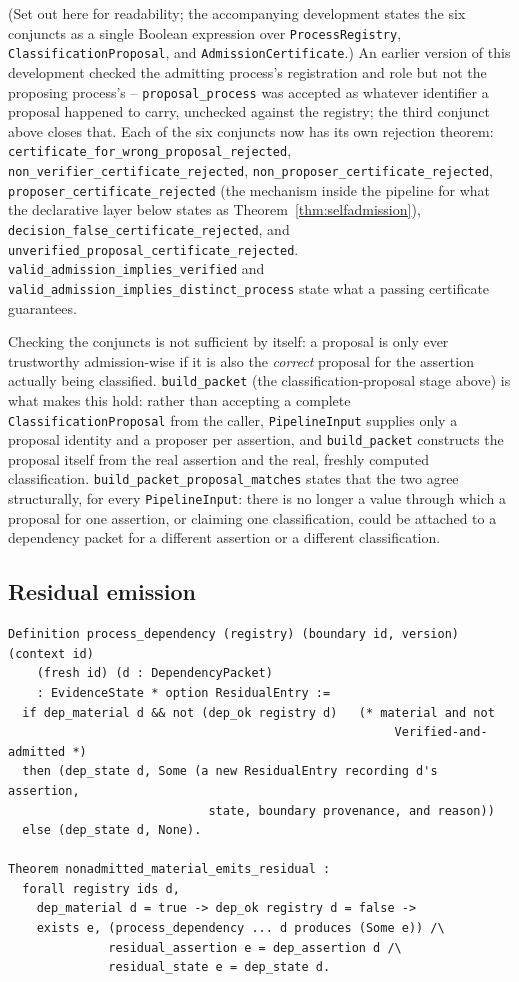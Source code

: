 \documentclass[smallcondensed,envcountsect,natbib]{svjour3}
\begin{document}
(Set out here for readability; the accompanying development states the six conjuncts as a single Boolean expression over \texttt{ProcessRegistry}, \texttt{ClassificationProposal}, and \texttt{AdmissionCertificate}.) An earlier version of this development checked the admitting process's registration and role but not the proposing process's -- \texttt{proposal\_process} was accepted as whatever identifier a proposal happened to carry, unchecked against the registry; the third conjunct above closes that. Each of the six conjuncts now has its own rejection theorem: \texttt{certificate\_for\_wrong\_proposal\_rejected}, \texttt{non\_verifier\_certificate\_rejected}, \texttt{non\_proposer\_certificate\_rejected}, \texttt{proposer\_certificate\_rejected} (the mechanism inside the pipeline for what the declarative layer below states as Theorem~\ref{thm:selfadmission}), \texttt{decision\_false\_certificate\_rejected}, and \texttt{unverified\_proposal\_certificate\_rejected}. \texttt{valid\_admission\_implies\_verified} and \texttt{valid\_admission\_implies\_distinct\_process} state what a passing certificate guarantees.

Checking the conjuncts is not sufficient by itself: a proposal is only ever trustworthy admission-wise if it is also the \emph{correct} proposal for the assertion actually being classified. \texttt{build\_packet} (the classification-proposal stage above) is what makes this hold: rather than accepting a complete \texttt{ClassificationProposal} from the caller, \texttt{PipelineInput} supplies only a proposal identity and a proposer per assertion, and \texttt{build\_packet} constructs the proposal itself from the real assertion and the real, freshly computed classification. \texttt{build\_packet\_proposal\_matches} states that the two agree structurally, for every \texttt{PipelineInput}: there is no longer a value through which a proposal for one assertion, or claiming one classification, could be attached to a dependency packet for a different assertion or a different classification.

\subsection*{Residual emission}

\begin{lstlisting}
Definition process_dependency (registry) (boundary id, version) (context id)
    (fresh id) (d : DependencyPacket)
    : EvidenceState * option ResidualEntry :=
  if dep_material d && not (dep_ok registry d)   (* material and not
                                                      Verified-and-admitted *)
  then (dep_state d, Some (a new ResidualEntry recording d's assertion,
                            state, boundary provenance, and reason))
  else (dep_state d, None).

Theorem nonadmitted_material_emits_residual :
  forall registry ids d,
    dep_material d = true -> dep_ok registry d = false ->
    exists e, (process_dependency ... d produces (Some e)) /\
              residual_assertion e = dep_assertion d /\
              residual_state e = dep_state d.
\end{lstlisting}
\end{document}
